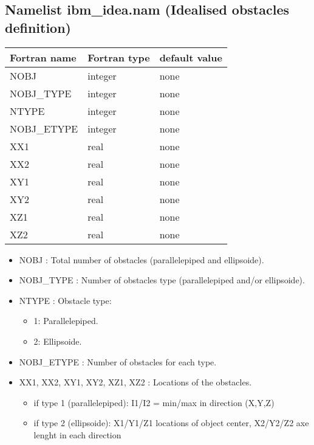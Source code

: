 \subsection{Namelist ibm\_idea.nam (Idealised obstacles definition)}
\label{s:namibmidea}
\begin{center}
\begin{tabular} {|l|l|l|}
\hline
Fortran name  & Fortran type  & default value \\
\hline
NOBJ          & integer       & none       \\
NOBJ\_TYPE    & integer       & none       \\
NTYPE         & integer       & none       \\
NOBJ\_ETYPE   & integer       & none       \\
XX1           & real          & none       \\
XX2           & real          & none       \\
XY1           & real          & none       \\
XY2           & real          & none       \\
XZ1           & real          & none       \\
XZ2           & real          & none       \\
\hline
\end{tabular}
\end{center}

\begin{itemize}

\item NOBJ   : Total number of obstacles (parallelepiped and ellipsoide).

\item NOBJ\_TYPE   : Number of obstacles type (parallelepiped and/or ellipsoide).

\item NTYPE   : Obstacle type:
\begin{itemize}
\item 1: Parallelepiped.
\item 2: Ellipsoide.
\end{itemize}

\item NOBJ\_ETYPE   : Number of obstacles for each type.

\item XX1, XX2, XY1, XY2, XZ1, XZ2   : Locations of the obstacles.
\begin{itemize}
 \item if type 1 (parallelepiped): I1/I2 = min/max in direction (X,Y,Z)
 \item if type 2 (ellipsoide): X1/Y1/Z1 locations of object center, X2/Y2/Z2 axe lenght in each direction
\end{itemize}
\end{itemize}

